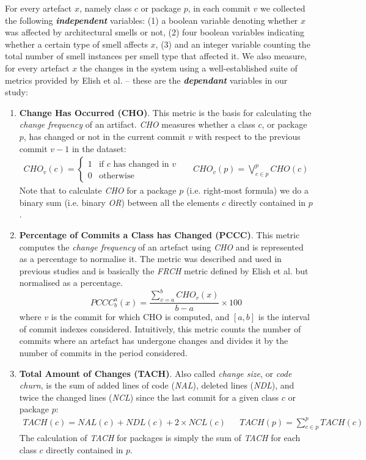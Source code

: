 For every artefact $x$, namely class $c$ or package $p$, in each commit $v$ we collected the following \textbf{\emph{independent}} variables: (1) a boolean variable denoting whether $x$ was affected by architectural smells or not, (2) four boolean variables indicating whether a certain type of smell affects $x$, (3) and an integer variable counting the total number of smell instances per smell type that affected it.
We also measure, for every artefact $x$ the changes in the system using a well-established suite of metrics provided by Elish et al. \cite{Elish2013} -- these are the \textbf{\emph{dependant}} variables in our study:
\begin{enumerate}
   \item \textbf{Change Has Occurred (CHO)}. This metric is the basis for calculating the \emph{change frequency} of an artifact. \emph{CHO} measures whether a class $c$, or package $p$, has changed or not in the current commit $v$ with respect to the previous commit $v-1$ in the dataset:
    \begin{align*} 
    CHO_v(c) = \begin{cases}
        1 & \text{if } c \text{ has changed in } v \\
        0 & \text{otherwise}
    \end{cases} &&
    CHO_v(p) = \bigvee_{c \in p}^{p} CHO(c)
    \end{align*} 
    Note that to calculate \emph{CHO} for a package $p$ (i.e. right-most formula) we do a binary sum (i.e. binary \emph{OR}) between all the elements $c$ directly contained in $p$.

    \item \textbf{Percentage of Commits a Class has Changed (PCCC)}. This metric computes the \emph{change frequency} of an artefact using \emph{CHO} and is represented as a percentage to normalise it. The metric was described and used in previous studies \cite{Arvanitou2017,Zhang2013} and is basically the \emph{FRCH} metric defined by Elish et al. \cite{Elish2013} but normalised as a percentage.
    $$PCCC^a_b(x) = \frac{\sum_{v = a}^{b} CHO_r(x)}{b-a} \times 100$$
    where $v$ is the commit for which CHO is computed, and $[a, b]$ is the interval of commit indexes considered.
    Intuitively, this metric counts the number of commits where an artefact has undergone changes and divides it by the number of commits in the period considered.

    \item \textbf{Total Amount of Changes (TACH)}. Also called \emph{change size}, or \emph{code churn}, is the sum of added lines of code (\emph{NAL}), deleted lines (\emph{NDL}), and twice the changed lines (\emph{NCL}) since the last commit\cite{Elish2013} for a given class $c$ or package $p$:
    \begin{align*}
    TACH(c) = NAL(c) + NDL(c) + 2 \times NCL(c) &&   
    TACH(p) = \sum_{c \in p}^{p} TACH(c) 
    \end{align*}
    The calculation of \emph{TACH} for packages is simply the sum of \emph{TACH} for each class $c$ directly contained in $p$.
\end{enumerate}



